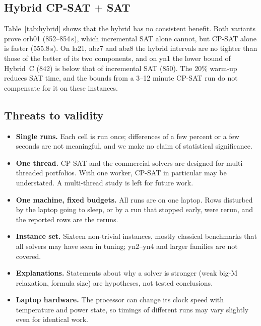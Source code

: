 \documentclass[a4paper,fleqn]{cas-sc}
\begin{document}
\subsection{Hybrid CP-SAT $+$ SAT}

Table~\ref{tab:hybrid} shows that the hybrid has no consistent benefit.
Both variants prove orb01 (852--854\,s), which incremental SAT alone cannot, but CP-SAT alone is faster (555.8\,s).
On la21, abz7 and abz8 the hybrid intervals are no tighter than those of the better of its two components, and on yn1 the lower bound of Hybrid~C (842) is below that of incremental SAT (850).
The 20\% warm-up reduces SAT time, and the bounds from a 3--12 minute CP-SAT run do not compensate for it on these instances.

\subsection{Threats to validity}
\begin{itemize}
 \item \textbf{Single runs.} Each cell is run once; differences of a few percent or a few seconds are not meaningful, and we make no claim of statistical significance.
 \item \textbf{One thread.} CP-SAT and the commercial solvers are designed for multi-threaded portfolios. With one worker, CP-SAT in particular may be understated. A multi-thread study is left for future work.
 \item \textbf{One machine, fixed budgets.} All runs are on one laptop. Rows disturbed by the laptop going to sleep, or by a run that stopped early, were rerun, and the reported rows are the reruns.
 \item \textbf{Instance set.} Sixteen non-trivial instances, mostly classical benchmarks that all solvers may have seen in tuning; yn2--yn4 and larger families are not covered.
 \item \textbf{Explanations.} Statements about why a solver is stronger (weak big-M relaxation, formula size) are hypotheses, not tested conclusions.
 \item \textbf{Laptop hardware.} The processor can change its clock speed with temperature and power state, so timings of different runs may vary slightly even for identical work.
\end{itemize}

\end{document}
